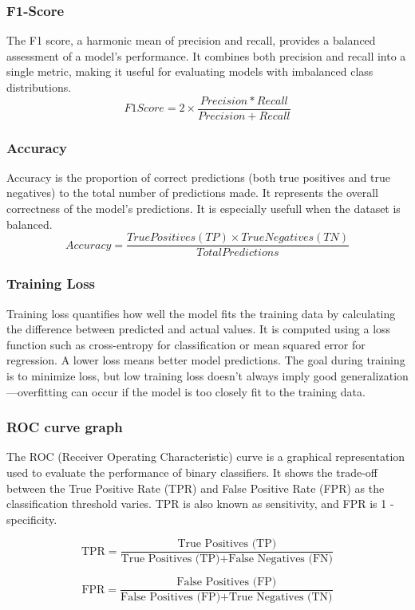 \subsubsection{F1-Score}
The F1 score, a harmonic mean of precision
and recall, provides a balanced assessment of a model’s
performance. It combines both precision and recall into a
single metric, making it useful for evaluating models with imbalanced class distributions.
\[F1Score=2 \times \frac{Precision*Recall}{Precision+Recall}\]

\subsubsection{Accuracy}
Accuracy is the proportion of correct predictions (both true positives and true negatives) to the total number of predictions made. It represents the overall correctness of the model's predictions. It is especially usefull when the dataset is balanced.
\[Accuracy= \frac{True Positives (TP)\times True Negatives (TN)}{Total Predictions}\]


\subsubsection{Training Loss}
Training loss quantifies how well the model fits the training data by calculating the difference between predicted and actual values. It is computed using a loss function such as cross-entropy for classification or mean squared error for regression. A lower loss means better model predictions. The goal during training is to minimize loss, but low training loss doesn’t always imply good generalization—overfitting can occur if the model is too closely fit to the training data.

\subsubsection{ROC curve graph}
The ROC (Receiver Operating Characteristic) curve is a graphical representation used to evaluate the performance of binary classifiers. It shows the trade-off between the True Positive Rate (TPR) and False Positive Rate (FPR) as the classification threshold varies. TPR is also known as sensitivity, and FPR is 1 - specificity.

\[
\text{TPR} = \frac{\text{True Positives (TP)}}{\text{True Positives (TP)} + \text{False Negatives (FN)}}
\]

\[
\text{FPR} = \frac{\text{False Positives (FP)}}{\text{False Positives (FP)} + \text{True Negatives (TN)}}
\]

